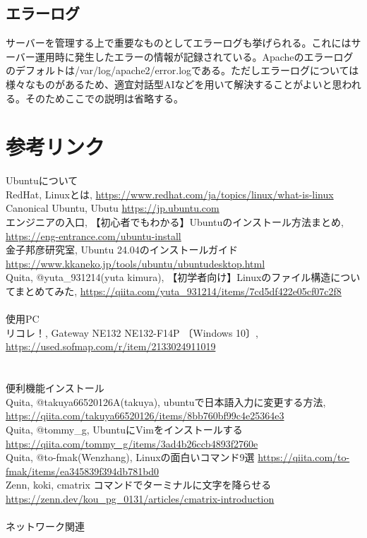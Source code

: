\documentclass[a4paper, 11pt, dvipdfmx]{jsarticle}
\begin{document}
\subsection{エラーログ}
サーバーを管理する上で重要なものとしてエラーログも挙げられる。これにはサーバー運用時に発生したエラーの情報が記録されている。Apacheのエラーログのデフォルトは/var/log/apache2/error.logである。ただしエラーログについては様々なものがあるため、適宜対話型AIなどを用いて解決することがよいと思われる。そのためここでの説明は省略する。
\newpage
\section{参考リンク}
Ubuntuについて\\
RedHat, Linuxとは, \url{https://www.redhat.com/ja/topics/linux/what-is-linux}\\
Canonical Ubuntu, Ubutu \url{https://jp.ubuntu.com}\\
エンジニアの入口, 【初心者でもわかる】Ubuntuのインストール方法まとめ, \url{https://eng-entrance.com/ubuntu-install}\\
金子邦彦研究室, Ubuntu 24.04のインストールガイド \url{https://www.kkaneko.jp/tools/ubuntu/ubuntudesktop.html}\\
Quita, @yuta\_931214(yuta kimura), 【初学者向け】Linuxのファイル構造についてまとめてみた, \url{https://qiita.com/yuta_931214/items/7cd5df422e05cf07c2f8}
\\\\
使用PC\\
リコレ！, Gateway NE132 NE132-F14P 〔Windows 10〕, \url{https://used.sofmap.com/r/item/2133024911019}\\
\\\\
便利機能インストール\\
Quita, @takuya66520126A(takuya), ubuntuで日本語入力に変更する方法, \url{https://qiita.com/takuya66520126/items/8bb760bf99c4e25364e3}\\
Quita, @tommy\_g, UbuntuにVimをインストールする \url{https://qiita.com/tommy_g/items/3ad4b26ccb4893f2760e}\\
Quita, @to-fmak(Wenzhang), Linuxの面白いコマンド9選 \url{https://qiita.com/to-fmak/items/ea345839f394db781bd0}\\
Zenn, koki, cmatrix コマンドでターミナルに文字を降らせる \url{https://zenn.dev/kou_pg_0131/articles/cmatrix-introduction}\\
\\
ネットワーク関連\\
\end{document}
